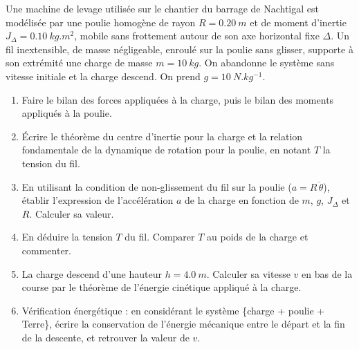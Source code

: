 \documentclass[11pt]{article}
\begin{document}
\begin{exercice}
Une machine de levage utilisée sur le chantier du barrage de Nachtigal est modélisée par une poulie homogène de rayon $R = \SI{0,20}{m}$ et de moment d'inertie $J_\Delta = \SI{0,10}{kg.m^2}$, mobile sans frottement autour de son axe horizontal fixe $\Delta$. Un fil inextensible, de masse négligeable, enroulé sur la poulie sans glisser, supporte à son extrémité une charge de masse $m = \SI{10}{kg}$. On abandonne le système sans vitesse initiale et la charge descend. On prend $g = \SI{10}{N.kg^{-1}}$.
\begin{enumerate}
\item Faire le bilan des forces appliquées à la charge, puis le bilan des moments appliqués à la poulie.
\item Écrire le théorème du centre d'inertie pour la charge et la relation fondamentale de la dynamique de rotation pour la poulie, en notant $T$ la tension du fil.
\item En utilisant la condition de non-glissement du fil sur la poulie ($a = R\,\ddot{\theta}$), établir l'expression de l'accélération $a$ de la charge en fonction de $m$, $g$, $J_\Delta$ et $R$. Calculer sa valeur.
\item En déduire la tension $T$ du fil. Comparer $T$ au poids de la charge et commenter.
\item La charge descend d'une hauteur $h = \SI{4,0}{m}$. Calculer sa vitesse $v$ en bas de la course par le théorème de l'énergie cinétique appliqué à la charge.
\item Vérification énergétique : en considérant le système \{charge + poulie + Terre\}, écrire la conservation de l'énergie mécanique entre le départ et la fin de la descente, et retrouver la valeur de $v$.
\end{enumerate}
\end{exercice}
\end{document}
